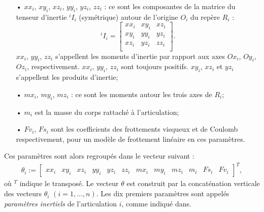 \documentclass[12pt,a4paper,twoside]{report}
\begin{document}
\begin{itemize}
\item[•] $xx_i$, $xy_i$, $xz_i$, $yy_i$, $yz_i$, $zz_i$ : ce sont les composantes de la matrice du tenseur d'inertie $^iI_{i}$ (symétrique) autour de l'origine $O_i$ du repère $R_i$ :
$$ ^iI_{i} = \left[ \begin{array}{ccc}
xx_i & xy_i & xz_i \\ xy_i & yy_i & yz_i \\ xz_i & yz_i & zz_i \\
\end{array} \right]. $$
$xx_i$, $yy_i$, $zz_i$ s'appellent les moments d'inertie par rapport aux axes $Ox_i$, $Oy_i$, $Oz_i$, respectivement. $xx_i$, $yy_i$, $zz_i$ sont toujours positifs. $xy_i$, $xz_i$ et $yz_i$ s'appellent les produits d'inertie;
\item[•] $mx_i$, $my_i$, $mz_i $ : ce sont les moments autour les trois axes de $R_i$;
\item[•] $m_i$ est la masse du corps rattaché à l'articulation;
\item[•] $Fv_i$, $Fs_i$ sont les coefficients des frottements visqueux et de Coulomb respectivement, pour un modèle de frottement linéaire en ces paramètres.
\end{itemize}
Ces paramètres sont alors regroupés dans le vecteur suivant :
\begin{equation}
\begin{array}{c}
\theta_i := \left[ \begin{array}{ccccccccccccc} xx_i & xy_i & xz_i & yy_i & yz_i & zz_i & mx_i & my_i & mz_i & m_i & Fs_i & Fv_i \end{array} \right]^T,
\end{array}
\label{vect_param}
\end{equation}
où $^T$ indique le transposé. Le vecteur $\theta$ est construit par la concaténation verticale des vecteurs $\theta_i$ $(i = 1,...,n)$. Les dix premiers paramètres sont appelés \textit{paramètres inertiels} de l'articulation $i$, comme indiqué dans.
\end{document}
